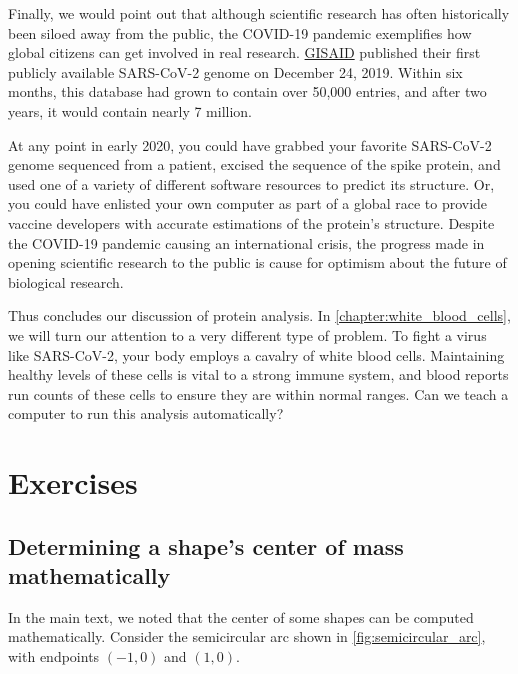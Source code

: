 Finally, we would point out that although scientific research has often historically been siloed away from the public, the COVID-19 pandemic exemplifies how global citizens can get involved in real research. \href{https://www.gisaid.org}{GISAID} published their first publicly available SARS-CoV-2 genome on December 24, 2019. Within six months, this database had grown to contain over 50,000 entries, and after two years, it would contain nearly 7 million.

At any point in early 2020, you could have grabbed your favorite SARS-CoV-2 genome sequenced from a patient, excised the sequence of the spike protein, and used one of a variety of different software resources to predict its structure. Or, you could have enlisted your own computer as part of a global race to provide vaccine developers with accurate estimations of the protein's structure. Despite the COVID-19 pandemic causing an international crisis, the progress made in opening scientific research to the public is cause for optimism about the future of biological research.

Thus concludes our discussion of protein analysis. In \autoref{chapter:white_blood_cells}, we will turn our attention to a very different type of problem. To fight a virus like SARS-CoV-2, your body employs a cavalry of white blood cells. Maintaining healthy levels of these cells is vital to a strong immune system, and blood reports run counts of these cells to ensure they are within normal ranges. Can we teach a computer to run this analysis automatically?

\newpage

\FloatBarrier
\section{Exercises}
\label{sec:coronavirus_exercises}

\subsection{Determining a shape's center of mass mathematically}

In the main text, we noted that the center of some shapes can be computed mathematically. Consider the semicircular arc shown in \autoref{fig:semicircular_arc}, with endpoints $(-1, 0)$ and $(1, 0)$.\\



